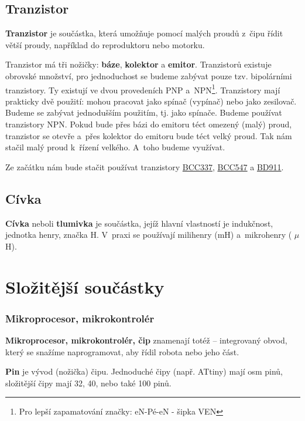 \subsection{Tranzistor} \label{tranzistor}

{\bf Tranzistor} je součástka, která umožňuje pomocí malých proudů z~čipu řídit větší proudy, například do reproduktoru nebo motorku. 

Tranzistor má tři nožičky: {\bf báze}, {\bf kolektor} a {\bf emitor}. 
Tranzistorů existuje obrovské množství, pro jednoduchost se budeme zabývat pouze tzv. bipolárními tranzistory.
 Ty existují ve dvou provedeních PNP a~NPN\footnote{Pro lepší zapamatování značky: eN-Pé-eN - šipka VEN}. 
 Tranzistory mají prakticky dvě použití: mohou pracovat jako spínač (vypínač) nebo jako zesilovač.
  Budeme se zabývat jednodušším použitím, tj. jako spínače. 
  Budeme používat tranzistory NPN. 
  Pokud bude přes bázi do emitoru téct omezený (malý) proud, tranzistor se otevře a~přes kolektor do emitoru bude téct velký proud. 
  Tak nám stačil malý proud k~řízení velkého. A~toho budeme využívat. 

Ze začátku nám bude stačit používat tranzistory 
\hyperlink{BCC337}{BCC337}, 
\hyperlink{BCC547}{BCC547} a
\hyperlink{BD911}{BD911}. 


\subsection{Cívka}

{\bf Cívka} neboli {\bf tlumivka} je součástka, 
jejíž hlavní vlastností je indukčnost, jednotka henry, značka H.
 V~praxi se používají milihenry (mH) a~mikrohenry ( $\mu$H).

\section{Složitější součástky}

\subsubsection{Mikroprocesor, mikrokontrolér} 

{\bf Mikroprocesor, mikrokontrolér, čip}    
znamenají totéž -- integrovaný obvod, který se snažíme naprogramovat, aby řídil robota nebo jeho část. \label{cip}

{\bf Pin}  \label{pin} je vývod (nožička) čipu. Jednoduché čipy (např. ATtiny) mají osm pinů, složitější čipy mají 32, 40, nebo také 100 pinů.

